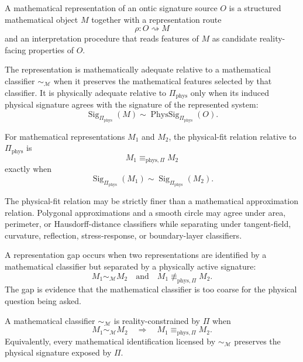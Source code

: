 \begin{definition}
\label{def:reality-constrained-mathematical-representation}
A mathematical representation of an ontic signature source $O$ is a structured mathematical object $M$ together with a representation route
$$
\rho:O\rightsquigarrow M
$$
and an interpretation procedure that reads features of $M$ as candidate reality-facing properties of $O$.
\end{definition}

The representation is mathematically adequate relative to a mathematical classifier $\sim_{\mathcal M}$ when it preserves the mathematical features selected by that classifier. It is physically adequate relative to $\Pi_{\mathrm{phys}}$ only when its induced physical signature agrees with the signature of the represented system:
$$
\operatorname{Sig}_{\Pi_{\mathrm{phys}}}(M)
\sim
\operatorname{PhysSig}_{\Pi_{\mathrm{phys}}}(O).
$$

\begin{definition}
\label{def:physical-fit-relation}
For mathematical representations $M_1$ and $M_2$, the physical-fit relation relative to $\Pi_{\mathrm{phys}}$ is
$$
M_1\equiv_{\mathrm{phys},\Pi}M_2
$$
exactly when
$$
\operatorname{Sig}_{\Pi_{\mathrm{phys}}}(M_1)
\sim
\operatorname{Sig}_{\Pi_{\mathrm{phys}}}(M_2).
$$
\end{definition}

The physical-fit relation may be strictly finer than a mathematical approximation relation. Polygonal approximations and a smooth circle may agree under area, perimeter, or Hausdorff-distance classifiers while separating under tangent-field, curvature, reflection, stress-response, or boundary-layer classifiers.

\begin{definition}
\label{def:representation-gap}
A representation gap occurs when two representations are identified by a mathematical classifier but separated by a physically active signature:
$$
M_1\sim_{\mathcal M}M_2
\quad\text{and}\quad
M_1\not\equiv_{\mathrm{phys},\Pi}M_2.
$$
The gap is evidence that the mathematical classifier is too coarse for the physical question being asked.
\end{definition}

\begin{definition}
\label{def:reality-constrained-classifier}
A mathematical classifier $\sim_{\mathcal M}$ is reality-constrained by $\Pi$ when
$$
M_1\sim_{\mathcal M}M_2
\quad\Longrightarrow\quad
M_1\equiv_{\mathrm{phys},\Pi}M_2.
$$
Equivalently, every mathematical identification licensed by $\sim_{\mathcal M}$ preserves the physical signature exposed by $\Pi$.
\end{definition}

